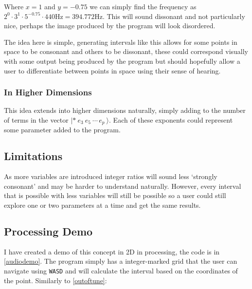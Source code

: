 Where $x=1$ and $y=-0.75$ we can simply find the frequency as $2^0 \cdot 3^1
\cdot 5^{-0.75} \cdot 440\si{\hertz} = 394.772\si{\hertz}$. This will sound
dissonant and not particularly nice, perhaps the image produced by the program
will look disordered.

The idea here is simple, generating intervals like this allows for some points
in space to be consonant and others to be dissonant, these could correspond
visually with some output being produced by the program but should hopefully
allow a user to differentiate between points in space using their sense of
hearing.

\subsubsection{In Higher Dimensions}
This idea extends into higher dimensions naturally, simply adding to the number
of terms in the vector $|*\ e_3\ e_5\ \cdots\, e_p\  \rangle$. Each of these
exponents could represent some parameter added to the program. 

\subsection{Limitations}
As more variables are introduced integer ratios will sound less `strongly
consonant' and may be harder to understand naturally. However, every interval
that is possible with less variables will still be possible so a user could
still explore one or two parameters at a time and get the same results.

\subsection{Processing Demo}
I have created a demo of this concept in 2D in processing, the code is in
\autoref{audiodemo}. The program simply has a integer-marked grid that the user
can navigate using \verb|WASD| and will calculate the interval based on the
coordinates of the point. Similarly to \autoref{outoftune}:

